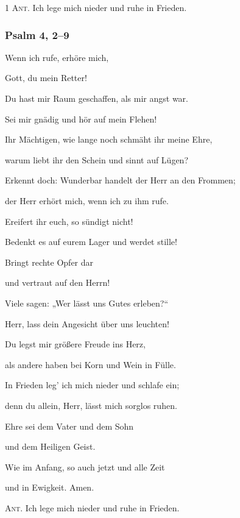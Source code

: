 \noindent \textsc{1 Ant.} Ich lege mich nieder und ruhe in Frieden.

\subsubsection{Psalm 4, 2--9}

\noindent Wenn ich rufe, erhöre mich,~\GreStar{}~\nopagebreak

Gott, du mein Retter! 

\noindent Du hast mir Raum geschaffen, als mir angst war.~\GreStar{}~\nopagebreak

Sei mir gnädig und hör auf mein Flehen!

\noindent Ihr Mächtigen, wie lange noch schmäht ihr meine Ehre,~\GreStar{}~\nopagebreak

warum liebt ihr den Schein und sinnt auf Lügen?

\noindent Erkennt doch: Wunderbar handelt der Herr an den Frommen;~\GreStar{}~\nopagebreak

der Herr erhört mich, wenn ich zu ihm rufe.

\noindent Ereifert ihr euch, so sündigt nicht!~\GreStar{}~\nopagebreak

Bedenkt es auf eurem Lager und werdet stille!

\noindent Bringt rechte Opfer dar~\GreStar{}~\nopagebreak

und vertraut auf den Herrn!

\noindent Viele sagen: „Wer lässt uns Gutes erleben?“~\GreStar{}~\nopagebreak

Herr, lass dein Angesicht über uns leuchten!

\noindent Du legst mir größere Freude ins Herz,~\GreStar{}~\nopagebreak

als andere haben bei Korn und Wein in Fülle.

\noindent In Frieden leg’ ich mich nieder und schlafe ein;~\GreStar{}~\nopagebreak

denn du allein, Herr, lässt mich sorglos ruhen.

\noindent Ehre sei dem Vater und dem Sohn~\GreStar{}~\nopagebreak

und dem Heiligen Geist.

\noindent Wie im Anfang, so auch jetzt und alle Zeit~\GreStar{}~\nopagebreak

und in Ewigkeit. Amen.

\vspace{10pt}

\noindent \textsc{Ant.} Ich lege mich nieder und ruhe in Frieden. 

